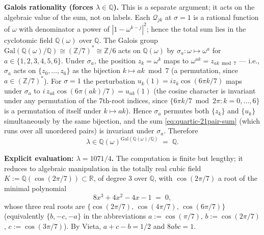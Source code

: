 \textbf{Galois rationality (forces $\lambda \in \mathbb{Q}$).}
This is a separate argument; it acts on the algebraic value
of the sum, not on labels.  Each $\mathcal{Q}_{jk}$ at
$\sigma = 1$ is a rational function of $\omega$ with
denominator a power of $|1 - \omega^{k-j}|^2$; hence the total
sum lies in the cyclotomic field $\mathbb{Q}(\omega)$ over
$\mathbb{Q}$.  The Galois group
$\mathrm{Gal}(\mathbb{Q}(\omega)/\mathbb{Q}) \cong (\mathbb{Z}/7)^*
\cong \mathbb{Z}/6$ acts on $\mathbb{Q}(\omega)$ by
$\sigma_a: \omega \mapsto \omega^a$ for $a \in \{1, 2, 3, 4, 5, 6\}$.
Under $\sigma_a$, the position $z_k = \omega^k$ maps to
$\omega^{ak} = z_{ak \bmod 7}$ — i.e., $\sigma_a$ acts on
$\{z_0, \ldots, z_6\}$ as the bijection $k \mapsto ak \bmod 7$
(a permutation, since $a \in (\mathbb{Z}/7)^*$).
For $\sigma = 1$ the perturbation $u_k(1) = i z_k \cos(6\pi k/7)$
maps under $\sigma_a$ to $i\, z_{ak} \cos(6\pi (ak)/7) =
u_{ak}(1)$ (the cosine character is invariant under any
permutation of the $7$th-root indices, since
$\{6\pi k/7 \bmod 2\pi : k = 0, \ldots, 6\}$ is a permutation
of itself under $k \mapsto ak$).
Hence $\sigma_a$ permutes both $\{z_k\}$ and $\{u_k\}$
simultaneously by the same bijection, and the sum
\eqref{eq:quartic-21pair-sum} (which runs over all unordered
pairs) is invariant under $\sigma_a$.  Therefore
\begin{equation}\label{eq:lambda-rational}
  \lambda \in \mathbb{Q}(\omega)^{\mathrm{Gal}(\mathbb{Q}(\omega)/\mathbb{Q})}
  \;=\; \mathbb{Q}.
\end{equation}

\textbf{Explicit evaluation: $\lambda = 1071/4$.}
The computation is finite but lengthy; it reduces to algebraic
manipulation in the totally real cubic field
$K := \mathbb{Q}(\cos(2\pi/7)) \subset \mathbb{R}$, of degree
$3$ over $\mathbb{Q}$, with $\cos(2\pi/7)$ a root of the
minimal polynomial
\begin{equation}\label{eq:minpoly-cos2pi7}
  8x^3 + 4x^2 - 4x - 1 \;=\; 0,
\end{equation}
whose three real roots are
$\{\cos(2\pi/7),\, \cos(4\pi/7),\, \cos(6\pi/7)\}$
(equivalently $\{b, -c, -a\}$ in the abbreviations
$a := \cos(\pi/7)$, $b := \cos(2\pi/7)$, $c := \cos(3\pi/7)$).
By Vieta, $a + c - b = 1/2$ and $8abc = 1$.

